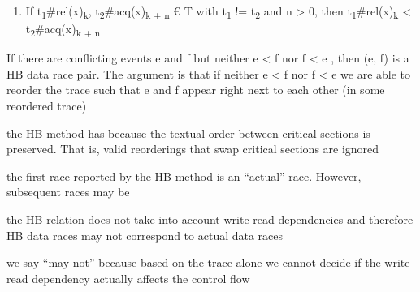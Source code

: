 \documentclass[landscape, a4paper]{article}
\begin{document}
\begin{minipage}[t]{0.19\linewidth}
\begin{betterlist}
\begin{enumerate}
			\item {} If t\textsubscript{1}\#rel(x)\textsubscript{k}, t\textsubscript{2}\#acq(x)\textsubscript{k + n} € T with t\textsubscript{1} != t\textsubscript{2} and n > 0, then t\textsubscript{1}\#rel(x)\textsubscript{k} < t\textsubscript{2}\#acq(x)\textsubscript{k + n}
		\end{enumerate}
		\item {} If there are conflicting events e and f but neither e < f nor f < e , then (e, f) is a HB data race pair. The argument is that if neither e < f nor f < e we are able to reorder the trace such that e and f appear right next to each other (in some reordered trace)
		\item {}
		\begin{betterlist}
			\item the HB method has  because the textual order between critical sections is preserved. That is, valid reorderings that swap critical sections are ignored
			\item the first race reported by the HB method is an \enquote{actual} race. However, subsequent races may be 
			\begin{betterlist}
				\item the HB relation does not take into account write-read dependencies and therefore HB data races may not correspond to actual data races
				\item we say \enquote{may not} because based on the trace alone we cannot decide if the write-read dependency actually affects the control flow

\end{betterlist}
\end{betterlist}
\end{betterlist}
\end{minipage}
\end{document}
